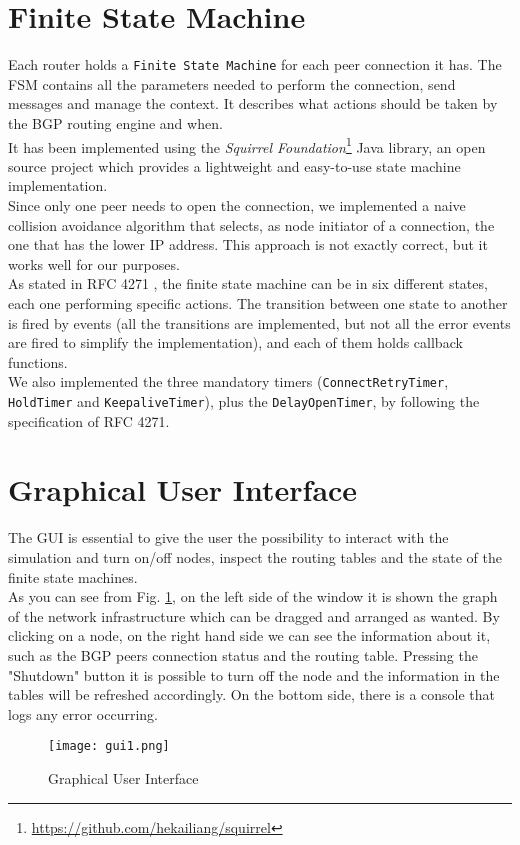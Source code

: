 \section{Finite State Machine}\label{fsm}
Each router holds a \texttt{Finite State Machine} for each peer connection it has. The FSM contains all the parameters needed to perform the connection, send messages and manage the context. It describes what actions should be taken by the BGP routing engine and when.\\
It has been implemented using the \textit{Squirrel Foundation}\footnote{\url{https://github.com/hekailiang/squirrel}} Java library, an open source project which provides a lightweight and easy-to-use state machine implementation.\\
Since only one peer needs to open the connection, we implemented a naive collision avoidance algorithm that selects, as node initiator of a connection, the one that has the lower IP address. This approach is not exactly correct, but it works well for our purposes.\\
As stated in RFC 4271 \cite{rfc4271}, the finite state machine can be in six different states, each one performing specific actions. The transition between one state to another is fired by events (all the transitions are implemented, but not all the error events are fired to simplify the implementation), and each of them holds callback functions.\\
We also implemented the three mandatory timers (\texttt{ConnectRetryTimer}, \texttt{HoldTimer} and \texttt{KeepaliveTimer}), plus the \texttt{DelayOpenTimer}, by following the specification of RFC 4271.

\section{Graphical User Interface}
The GUI is essential to give the user the possibility to interact with the simulation and turn on/off nodes, inspect the routing tables and the state of the finite state machines.\\
As you can see from Fig. \ref{fig:gui}, on the left side of the window it is shown the graph of the network infrastructure which can be dragged and arranged as wanted. By clicking on a node, on the right hand side we can see the information about it, such as the BGP peers connection status and the routing table. Pressing the "Shutdown" button it is possible to turn off the node and the information in the tables will be refreshed accordingly. 
On the bottom side, there is a console that logs any error occurring.
\begin{figure}[h]
    \centering
    \texttt{[image: gui1.png]}
    \caption{Graphical User Interface}
    \label{fig:gui}
\end{figure}


